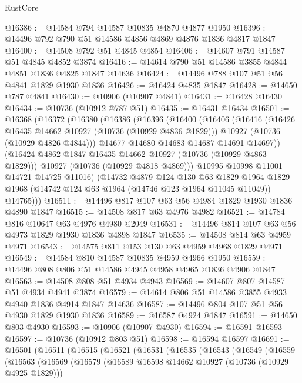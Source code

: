 \begin{lexlean}{RustCore}
\begin{coremodule}
@16386 := @14584 @794 @14587 @10835 @4870 @4877 @1950
@16396 := @14496 @792 @790 @51 @14586 @4856 @4869 @4876 @1836 @4817 @1847
@16400 := @14508 @792 @51 @4845 @4854
@16406 := @14607 @791 @14587 @51 @4845 @4852 @3874
@16416 := @14614 @790 @51 @14586 @3855 @4844 @4851 @1836 @4825 @1847 @14636
@16424 := @14496 @788 @107 @51 @56 @4841 @1829 @1930 @1836
@16426 := @16424 @4835 @1847
@16428 := @14650 @787 @4841
@16430 := @10906 (@10907 @4841)
@16431 := @16428 @16430
@16434 := @10736 (@10912 @787 @51)
@16435 := @16431 @16434
@16501 := @16368
    (@16372
      (@16380
        (@16386
          (@16396
            (@16400
              (@16406
                (@16416
                  (@16426 @16435 @14662 @10927 (@10736 (@10929 @4836 @1829)))
                  @10927
                  (@10736 (@10929 @4826 @4844)))
                @14677
                @14680
                @14683
                @14687
                @14691
                @14697))
            (@16424 @4862 @1847 @16435 @14662 @10927 (@10736 (@10929 @4863 @1829)))
            @10927
            (@10736 (@10929 @4818 @4869)))
          @10995
          @10998
          @11001
          @14721
          @14725
          @11016)
        (@14732
          @4879
          @124
          @130
          @63
          @1829
          @1964
          @1829
          @1968
          (@14742 @124 @63 @1964 (@14746 @123 @1964 @11045 @11049))
          @14765)))
@16511 := @14496 @817 @107 @63 @56 @4984 @1829 @1930 @1836 @4890 @1847
@16515 := @14508 @817 @63 @4976 @4982
@16521 := @14784 @816 @10647 @63 @4976 @4980 @2049
@16531 := @14496 @814 @107 @63 @56 @4973 @1829 @1930 @1836 @4898 @1847
@16535 := @14508 @814 @63 @4959 @4971
@16543 := @14575 @811 @153 @130 @63 @4959 @4968 @1829 @4971
@16549 := @14584 @810 @14587 @10835 @4959 @4966 @1950
@16559 := @14496 @808 @806 @51 @14586 @4945 @4958 @4965 @1836 @4906 @1847
@16563 := @14508 @808 @51 @4934 @4943
@16569 := @14607 @807 @14587 @51 @4934 @4941 @3874
@16579 := @14614 @806 @51 @14586 @3855 @4933 @4940 @1836 @4914 @1847 @14636
@16587 := @14496 @804 @107 @51 @56 @4930 @1829 @1930 @1836
@16589 := @16587 @4924 @1847
@16591 := @14650 @803 @4930
@16593 := @10906 (@10907 @4930)
@16594 := @16591 @16593
@16597 := @10736 (@10912 @803 @51)
@16598 := @16594 @16597
@16691 := @16501
    (@16511
      (@16515
        (@16521
          (@16531
            (@16535
              (@16543
                (@16549
                  (@16559
                    (@16563
                      (@16569
                        (@16579
                          (@16589 @16598 @14662 @10927 (@10736 (@10929 @4925 @1829)))

\end{coremodule}
\end{lexlean}
